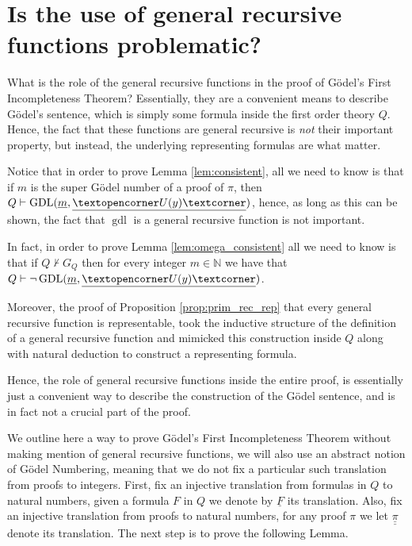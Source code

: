 \documentclass[12pt]{article}
\theoremstyle{plain}
\theoremstyle{definition}
\newcommand{\bb}[1]{\mathbb{#1}}
\newcommand{\adj}[1]{\text{\textopencorner}{#1}\text{\textcorner}}
\begin{document}
	\section{Is the use of general recursive functions problematic?}
	What is the role of the general recursive functions in the proof of G\"{o}del's First Incompleteness Theorem? Essentially, they are a convenient means to describe G\"{o}del's sentence, which is simply some formula inside the first order theory $Q$. Hence, the fact that these functions are general recursive is \emph{not} their important property, but instead, the underlying representing formulas are what matter.
	
	Notice that in order to prove Lemma \ref{lem:consistent}, all we need to know is that if $m$ is the super G\"{o}del number of a proof of $\pi$, then $Q \vdash \operatorname{GDL}(\underline{m},\underline{\adj{U(y)}})$, hence, as long as this can be shown, the fact that $\operatorname{gdl}$ is a general recursive function is not important.
	
	In fact, in order to prove Lemma \ref{lem:omega_consistent} all we need to know is that if $Q \not\vdash G_Q$ then for every integer $m \in \bb{N}$ we have that $Q \vdash \neg \operatorname{GDL}(\underline{m},\underline{\adj{U(y)}})$.
	
	Moreover, the proof of Proposition \ref{prop:prim_rec_rep} that every general recursive function is representable, took the inductive structure of the definition of a general recursive function and mimicked this construction inside $Q$ along with natural deduction to construct a representing formula.
	
	Hence, the role of general recursive functions inside the entire proof, is essentially just a convenient way to describe the construction of the G\"{o}del sentence, and is in fact not a crucial part of the proof.
	
	We outline here a way to prove G\"{o}del's First Incompleteness Theorem without making mention of general recursive functions, we will also use an abstract notion of G\"{o}del Numbering, meaning that we do not fix a particular such translation from proofs to integers. First, fix an injective translation from formulas in $Q$ to natural numbers, given a formula $F$ in $Q$ we denote by $\underline{F}$ its translation. Also, fix an injective translation from proofs to natural numbers, for any proof $\pi$ we let $\underline{\underline{\pi}}$ denote its translation. The next step is to prove the following Lemma.
	
\end{document}
